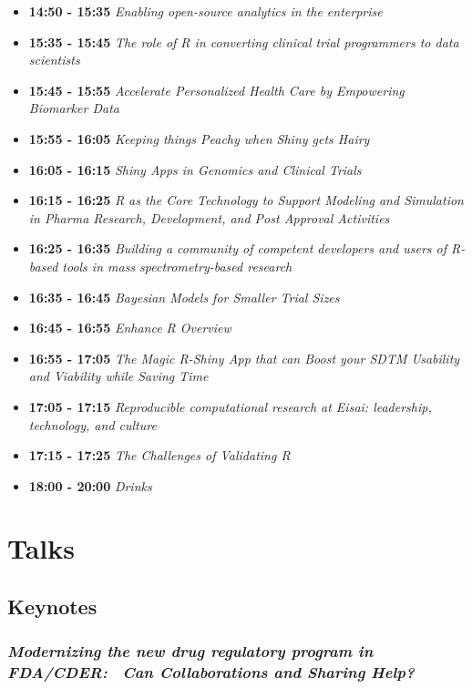 \documentclass[]{book}
\theoremstyle{definition}
\theoremstyle{definition}
\theoremstyle{definition}
\theoremstyle{remark}
\begin{document}
\begin{itemize}
\item
  \textbf{14:50 - 15:35} \emph{Enabling open-source analytics in the
  enterprise}
\item
  \textbf{15:35 - 15:45} \emph{The role of R in converting clinical
  trial programmers to data scientists}
\item
  \textbf{15:45 - 15:55} \emph{Accelerate Personalized Health Care by
  Empowering Biomarker Data}
\item
  \textbf{15:55 - 16:05} \emph{Keeping things Peachy when Shiny gets
  Hairy}
\item
  \textbf{16:05 - 16:15} \emph{Shiny Apps in Genomics and Clinical
  Trials}
\item
  \textbf{16:15 - 16:25} \emph{R as the Core Technology to Support
  Modeling and Simulation in Pharma Research, Development, and Post
  Approval Activities}
\item
  \textbf{16:25 - 16:35} \emph{Building a community of competent
  developers and users of R-based tools in mass spectrometry-based
  research}
\item
  \textbf{16:35 - 16:45} \emph{Bayesian Models for Smaller Trial Sizes}
\item
  \textbf{16:45 - 16:55} \emph{Enhance R Overview}
\item
  \textbf{16:55 - 17:05} \emph{The Magic R-Shiny App that can Boost your
  SDTM Usability and Viability while Saving Time}
\item
  \textbf{17:05 - 17:15} \emph{Reproducible computational research at
  Eisai: leadership, technology, and culture}
\item
  \textbf{17:15 - 17:25} \emph{The Challenges of Validating R}
\item
  \textbf{18:00 - 20:00} \emph{Drinks}
\end{itemize}

\hypertarget{part-talks}{%
\part{Talks}\label{part-talks}}

\hypertarget{keynotes}{%
\chapter{Keynotes}\label{keynotes}}

\hypertarget{modernizing-the-new-drug-regulatory-program-in-fdacder-can-collaborations-and-sharing-help}{%
\section{\texorpdfstring{\emph{Modernizing the new drug regulatory
program in FDA/CDER:~ Can Collaborations and Sharing
Help?}}{Modernizing the new drug regulatory program in FDA/CDER:~ Can Collaborations and Sharing Help?}}\label{modernizing-the-new-drug-regulatory-program-in-fdacder-can-collaborations-and-sharing-help}}
\end{document}
